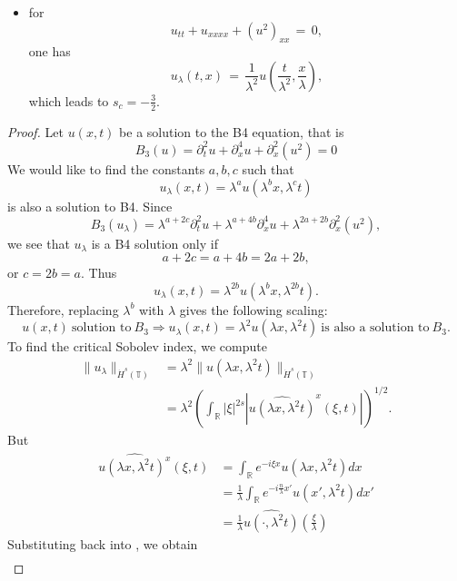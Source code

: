 \documentclass[12pt,reqno]{amsart}
\numberwithin{equation}{section}  %
\renewcommand{\cref}{\Cref}
\newcommand{\rr}{\mathbb{R}}
\newcommand{\ci}{\mathbb{T}}
\newcommand{\wh}{\widehat}
\begin{document}
\begin{itemize}
\item for 
\[
u_{tt}+u_{xxxx}+(u^2)_{xx}\,=\,0,
\]
one has 
\[
u_{\lambda}(t,x)\,=\,\frac{1}{\lambda^2}u\left(\frac{t}{\lambda^2}, \frac{x}{\lambda}\right),
\]
which leads to $s_c=-\frac 32$.
\end{itemize}
\begin{proof}
Let $u(x, t)$ be a solution to the B4 equation, that is
$$
B_3(u)=
\partial_t^2u + \partial^4_x u + \partial_x^2(u^2)  = 0
$$
We would like to find the constants
$a, b, c$ such that
\[
u_\lambda (x, t) = \lambda^a u(\lambda^b x, \lambda^c t)
\]
is also a solution to B4.  Since 
$$
B_3(u_\lambda)=
\lambda^{a+2c} \partial_t^2u 
+
\lambda^{a+4b} \partial^4_x u 
+
\lambda^{2a+2b}
\partial_x^2(u^2),  
$$
we see that $u_\lambda$ is a B4 solution only if
$$
a+2c=a+4b=2a+2b,
$$
or
$
c= 2b =a.
$
Thus
\[
u_\lambda (x, t) = \lambda^{2b} u(\lambda^{b}x,  \lambda^{2b} t).
\]
Therefore, replacing  $\lambda^b$ with  $ \lambda$ gives the following scaling:
\begin{equation}
\label{DP-scal}
\boxed{u(x, t) \ \text{solution to} \  B_3
\Longrightarrow 
u_\lambda (x, t) = \lambda^2 u(\lambda x, \lambda^2 t)  \ \text{is also a
solution to} \  B_3.}
\end{equation}
\label{rem:scaling}
To find the critical Sobolev index, we compute
\begin{equation}
\begin{split}
\| u_{\lambda} \|_{\dot{H}^s(\ci)} 
& = \lambda^{2} \| u(\lambda x, \lambda^2 t) \|_{\dot{H}^{s}(\ci)}
\\
& = \lambda^{2} \left( \int_{\rr} | \xi |^{2s} | \wh{u (\lambda x,
\lambda^{2} t)}^x (\xi, t)| \right)^{1/2}.
\end{split}
\label{crit-ind-comp}
\end{equation}
But
\begin{equation*}
\begin{split}
\wh{u(\lambda x, \lambda^{2}t)^x}(\xi, t)
& = \int_{\rr}e^{-i\xi x}u(\lambda x, \lambda^2 t) dx
\\
& = \frac{1}{\lambda} \int_{\rr}e^{-i \frac{n}{\lambda} x'}u(x',
\lambda^{2} t) dx'
\\
& = \frac{1}{\lambda} \wh{u(\cdot, \lambda^{2}t)}(\frac{\xi}{\lambda})
\end{split}
\end{equation*}
Substituting back into \cref{crit-ind-comp}, we obtain
\begin{equation*}
\begin{split}

\end{split}
\end{equation*}
\end{proof}
\end{document}
